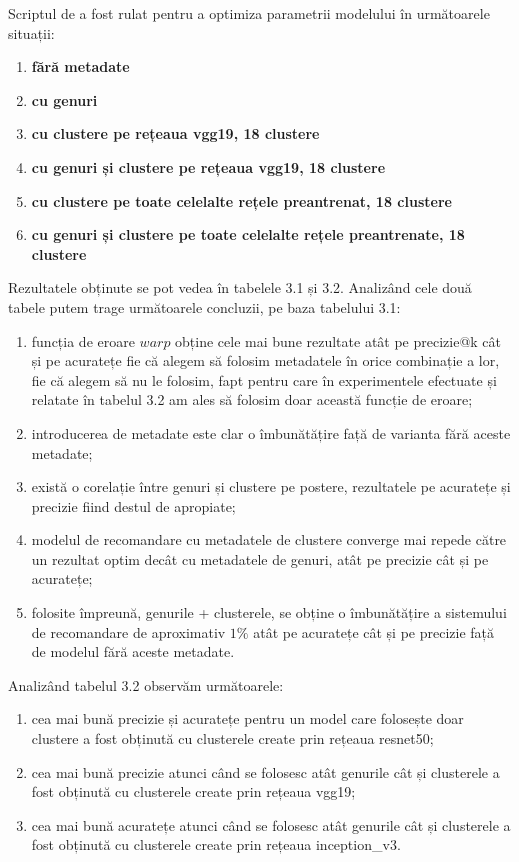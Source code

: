 Scriptul de a fost rulat pentru a optimiza parametrii modelului în următoarele situații:
\begin{enumerate}
	\item \textbf{fără metadate}
	\item \textbf{cu genuri}
	\item \textbf{cu clustere pe rețeaua vgg19, 18 clustere}
	\item \textbf{cu genuri și clustere pe rețeaua vgg19, 18 clustere}
	\item \textbf{cu clustere pe toate celelalte rețele preantrenat, 18 clustere}
	\item \textbf{cu genuri și clustere pe toate celelalte rețele preantrenate, 18 clustere}
\end{enumerate}
Rezultatele obținute se pot vedea în tabelele 3.1 și 3.2. Analizând cele două tabele putem trage următoarele concluzii, pe baza tabelului 3.1:
\begin{enumerate}
	\item funcția de eroare $warp$ obține cele mai bune rezultate atât pe precizie@k cât și pe acuratețe fie că alegem să folosim metadatele în orice combinație a lor, fie că alegem să nu le folosim, fapt pentru care în experimentele efectuate și relatate în tabelul 3.2 am ales să folosim doar această funcție de eroare;
	\item introducerea de metadate este clar o îmbunătățire față de varianta fără aceste metadate;
	\item există o corelație între genuri și clustere pe postere, rezultatele pe acuratețe și precizie fiind destul de apropiate;
	\item modelul de recomandare cu metadatele de clustere converge mai repede către un rezultat optim decât cu metadatele de genuri, atât pe precizie cât și pe acuratețe;
	\item folosite împreună, genurile + clusterele, se obține o îmbunătățire a sistemului de recomandare de aproximativ $1\%$ atât pe acuratețe cât și pe precizie față de modelul fără aceste metadate.
\end{enumerate}

Analizând tabelul 3.2 observăm următoarele:
\begin{enumerate}
	\item cea mai bună precizie și acuratețe pentru un model care folosește doar clustere a fost obținută cu clusterele create prin rețeaua resnet50;
	\item cea mai bună precizie atunci când se folosesc atât genurile cât și clusterele a fost obținută cu clusterele create prin rețeaua vgg19;
	\item cea mai bună acuratețe atunci când se folosesc atât genurile cât și clusterele a fost obținută cu clusterele create prin rețeaua inception\_v3.
\end{enumerate}

